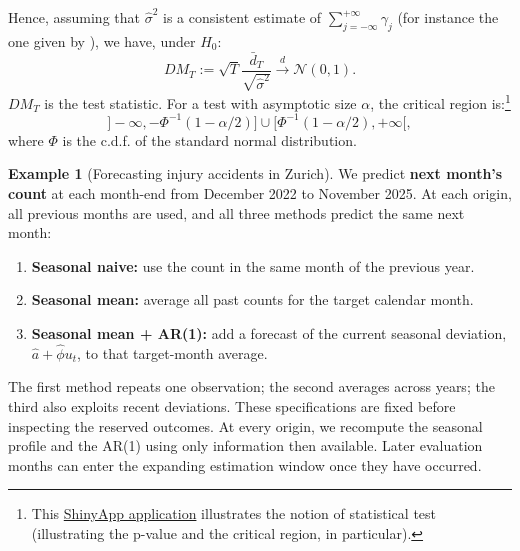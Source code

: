 \documentclass[
  11pt,
]{book}
\providecommand{\tightlist}{%
  \setlength{\itemsep}{0pt}\setlength{\parskip}{0pt}}
\theoremstyle{definition}
\theoremstyle{definition}
\newtheorem{example}{Example}[chapter]
\theoremstyle{definition}
\theoremstyle{definition}
\theoremstyle{remark}
\begin{document}
Hence, assuming that \(\hat{\sigma}^2\) is a consistent estimate of \(\sum_{j=-\infty}^{+\infty} \gamma_j\) (for instance the one given by \citet{Newey_West_1987}), we have, under \(H_0\):
\[
DM_T := \sqrt{T}\frac{\bar{d}_T}{\sqrt{\hat{\sigma}^2}} \overset{d}{\rightarrow}  \mathcal{N}(0,1).
\]
\(DM_T\) is the test statistic. For a test with asymptotic size \(\alpha\), the critical region is:\footnote{This \href{https://jrenne.shinyapps.io/tests/}{ShinyApp application} illustrates the notion of statistical test (illustrating the p-value and the critical region, in particular).}
\[
]-\infty,-\Phi^{-1}(1-\alpha/2)] \cup [\Phi^{-1}(1-\alpha/2),+\infty[,
\]
where \(\Phi\) is the c.d.f. of the standard normal distribution.

\begin{example}[Forecasting injury accidents in Zurich]
\protect\hypertarget{exm:SwissOutOfSample}{}\label{exm:SwissOutOfSample}We predict \textbf{next month's count} at each month-end from December 2022 to November 2025. At each origin, all previous months are used, and all three methods predict the same next month:

\begin{enumerate}
\def\labelenumi{\arabic{enumi}.}
\tightlist
\item
  \textbf{Seasonal naive:} use the count in the same month of the previous year.
\item
  \textbf{Seasonal mean:} average all past counts for the target calendar month.
\item
  \textbf{Seasonal mean + AR(1):} add a forecast of the current seasonal deviation, \(\widehat a+\widehat\phi u_t\), to that target-month average.
\end{enumerate}

The first method repeats one observation; the second averages across years; the third also exploits recent deviations. These specifications are fixed before inspecting the reserved outcomes. At every origin, we recompute the seasonal profile and the AR(1) using only information then available. Later evaluation months can enter the expanding estimation window once they have occurred.

\begin{table}[H]
\centering
\caption{\label{tab:zurich-expanding-forecasts}Expanding-window one-month-ahead forecasts, January 2023--December 2025 (36 forecasts per method). Errors are in accidents per month.}
\centering
{}
\end{table}


\end{example}
\end{document}
